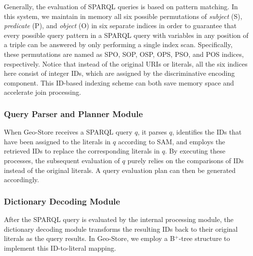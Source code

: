Generally, the evaluation of SPARQL queries is based on pattern
matching. In this system, we maintain in memory all six possible
permutations of \emph{subject} (S), \emph{predicate} (P), and
\emph{object} (O) in six separate indices in order to guarantee
that every possible query pattern in a SPARQL query with variables
in any position of a triple can be answered by only performing a
single index scan. Specifically, these permutations are named as
SPO, SOP, OSP, OPS, PSO, and POS indices, respectively. Notice
that instead of the original URIs or literals, all the six indices
here consist of integer IDs, which are assigned by the
discriminative encoding component. This ID-based indexing scheme
can both save memory space and accelerate join processing.


\subsubsection{Query Parser and Planner Module}

When Geo-Store receives a SPARQL query $q$, it parses $q$,
identifies the IDs that have been assigned to the literals in $q$
according to SAM, and employs the retrieved IDs to replace the
corresponding literals in $q$. By executing these processes, the
subsequent evaluation of $q$ purely relies on the comparisons of
IDs instead of the original literals. A query evaluation plan can
then be generated accordingly.


\subsubsection{Dictionary Decoding Module}

After the SPARQL query is evaluated by the internal processing
module, the dictionary decoding module transforms the resulting
IDs back to their original literals as the query results. In
Geo-Store, we employ a B$^{+}$-tree structure to implement this
ID-to-literal mapping.

